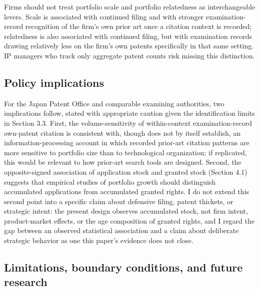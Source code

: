 \documentclass[12pt]{article}
\begin{document}
Firms should not treat portfolio scale and portfolio relatedness as interchangeable levers. Scale is associated with continued filing and with stronger examination-record recognition of the firm's own prior art once a citation context is recorded; relatedness is also associated with continued filing, but with examination records drawing relatively less on the firm's own patents specifically in that same setting. IP managers who track only aggregate patent counts risk missing this distinction.

\subsection{Policy implications}

For the Japan Patent Office and comparable examining authorities, two implications follow, stated with appropriate caution given the identification limits in Section 3.3. First, the volume-sensitivity of within-context examination-record own-patent citation is consistent with, though does not by itself establish, an information-processing account in which recorded prior-art citation patterns are more sensitive to portfolio size than to technological organization; if replicated, this would be relevant to how prior-art search tools are designed. Second, the opposite-signed association of application stock and granted stock (Section 4.1) suggests that empirical studies of portfolio growth should distinguish accumulated applications from accumulated granted rights. I do not extend this second point into a specific claim about defensive filing, patent thickets, or strategic intent: the present design observes accumulated stock, not firm intent, product-market effects, or the age composition of granted rights, and I regard the gap between an observed statistical association and a claim about deliberate strategic behavior as one this paper's evidence does not close.

\subsection{Limitations, boundary conditions, and future research}
\end{document}
